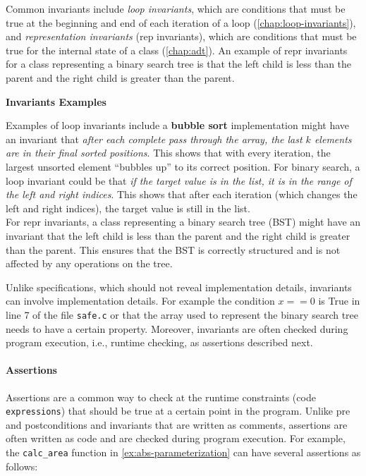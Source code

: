 \documentclass[oneside,11pt,dvipsnames]{book}
\newenvironment{commentbox}[1][]{
  \small
  \begin{mybox}
    {\small \textbf{#1}}
  }{
  \end{mybox}
}
\newcommand{\code}[1]{\texttt{#1}}
\begin{document}
Common invariants include \emph{loop invariants}, which are conditions that must be true at the beginning and end of each iteration of a loop (\autoref{chap:loop-invariants}), and \emph{representation invariants} (rep invariants), which are conditions that must be true for the internal state of a class (\autoref{chap:adt}). An example of repr invariants for a class representing a binary search tree is that the left child is less than the parent and the right child is greater than the parent.

\begin{commentbox}[Invariants Examples]
    Examples of loop invariants include a \textbf{bubble sort} implementation might have an invariant that \emph{after each complete pass through the array, the last $k$ elements are in their final sorted positions}. This shows that with every iteration, the largest unsorted element ``bubbles up'' to its correct position.
    For binary search, a loop invariant could be that \emph{if the target value is in the list, it is in the range of the left and right indices}. This shows that after each iteration (which changes the left and right indices), the target value is still in the list.
    \\

    For repr invariants, a class representing a binary search tree (BST) might have an invariant that the left child is less than the parent and the right child is greater than the parent. This ensures that the BST is correctly structured and is not affected by any operations on the tree.
\end{commentbox}


Unlike specifications, which should not reveal implementation details, invariants can involve implementation details.  For example the condition $x==0$ is True in line 7 of the file \code{safe.c} or that the array used to represent the binary search tree needs to have a certain property.  Moreover, invariants are often checked during program execution, i.e., runtime checking, as assertions described next.


\paragraph{Assertions} Assertions are a common way to check at the runtime constraints (code \texttt{expressions}) that should be true at a certain point in the program. Unlike pre and postconditions and invariants that are written as comments, assertions are often written as code and are checked during program execution. For example, the \code{calc\_area} function in \autoref{ex:abs-parameterization} can have several assertions as follows:
\end{document}
